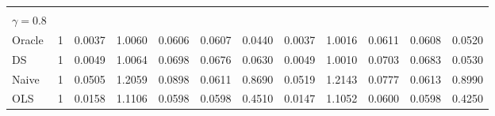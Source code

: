 \begin{tabular}{llllllllllll}
  \multicolumn{1}{r}{} &
  \multicolumn{1}{r}{} &
  \multicolumn{1}{r}{} &
  \multicolumn{1}{r}{} &
  \multicolumn{1}{r}{} &
  \multicolumn{1}{r}{} &
  \multicolumn{1}{r}{} &
  \multicolumn{1}{r}{} \\
\multicolumn{1}{l}{$\gamma = 0.8$} &
  \multicolumn{1}{|r}{} &
  \multicolumn{1}{r}{} &
  \multicolumn{1}{r}{} &
  \multicolumn{1}{r}{} &
  \multicolumn{1}{r}{} &
  \multicolumn{1}{r}{} &
  \multicolumn{1}{r}{} &
  \multicolumn{1}{r}{} &
  \multicolumn{1}{r}{} &
  \multicolumn{1}{r}{} &
  \multicolumn{1}{r}{} \\
\multicolumn{1}{l}{\hspace{1em}Oracle} &
  \multicolumn{1}{|r}{1} &
  \multicolumn{1}{r}{0.0037} &
  \multicolumn{1}{r}{1.0060} &
  \multicolumn{1}{r}{0.0606} &
  \multicolumn{1}{r}{0.0607} &
  \multicolumn{1}{r}{0.0440} &
  \multicolumn{1}{r}{0.0037} &
  \multicolumn{1}{r}{1.0016} &
  \multicolumn{1}{r}{0.0611} &
  \multicolumn{1}{r}{0.0608} &
  \multicolumn{1}{r}{0.0520} \\
\multicolumn{1}{l}{\hspace{1em}DS} &
  \multicolumn{1}{|r}{1} &
  \multicolumn{1}{r}{0.0049} &
  \multicolumn{1}{r}{1.0064} &
  \multicolumn{1}{r}{0.0698} &
  \multicolumn{1}{r}{0.0676} &
  \multicolumn{1}{r}{0.0630} &
  \multicolumn{1}{r}{0.0049} &
  \multicolumn{1}{r}{1.0010} &
  \multicolumn{1}{r}{0.0703} &
  \multicolumn{1}{r}{0.0683} &
  \multicolumn{1}{r}{0.0530} \\
\multicolumn{1}{l}{\hspace{1em}Naive} &
  \multicolumn{1}{|r}{1} &
  \multicolumn{1}{r}{0.0505} &
  \multicolumn{1}{r}{1.2059} &
  \multicolumn{1}{r}{0.0898} &
  \multicolumn{1}{r}{0.0611} &
  \multicolumn{1}{r}{0.8690} &
  \multicolumn{1}{r}{0.0519} &
  \multicolumn{1}{r}{1.2143} &
  \multicolumn{1}{r}{0.0777} &
  \multicolumn{1}{r}{0.0613} &
  \multicolumn{1}{r}{0.8990} \\
\multicolumn{1}{l}{\hspace{1em}OLS} &
  \multicolumn{1}{|r}{1} &
  \multicolumn{1}{r}{0.0158} &
  \multicolumn{1}{r}{1.1106} &
  \multicolumn{1}{r}{0.0598} &
  \multicolumn{1}{r}{0.0598} &
  \multicolumn{1}{r}{0.4510} &
  \multicolumn{1}{r}{0.0147} &
  \multicolumn{1}{r}{1.1052} &
  \multicolumn{1}{r}{0.0600} &
  \multicolumn{1}{r}{0.0598} &
  \multicolumn{1}{r}{0.4250} \\
\cline{1-12}
\end{tabular}
